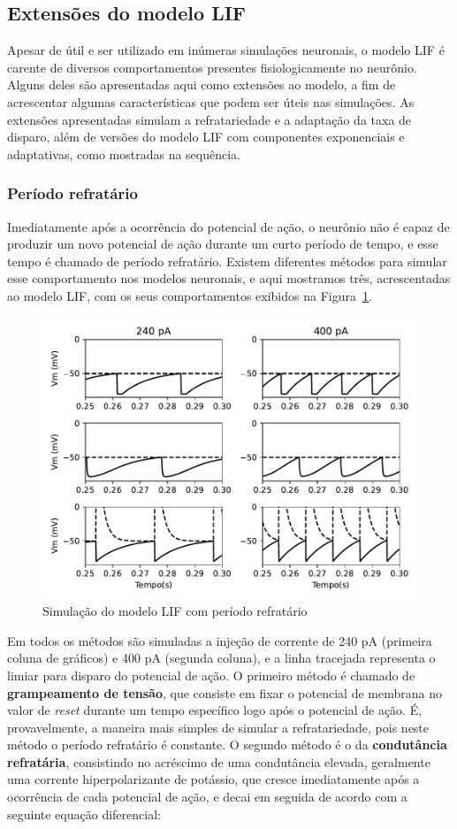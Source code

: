 
\subsection{Extensões do modelo LIF}
Apesar de útil e ser utilizado em inúmeras simulações neuronais, o modelo LIF é carente de diversos comportamentos presentes fisiologicamente no neurônio. Alguns deles são apresentadas aqui como extensões ao modelo, a fim de acrescentar algumas características que podem ser úteis nas simulações. As extensões apresentadas simulam a refratariedade e a adaptação da taxa de disparo, além de versões do modelo LIF com componentes exponenciais e adaptativas, como mostradas na sequência.
\subsubsection{Período refratário}
Imediatamente após a ocorrência do potencial de ação, o neurônio não é capaz de produzir um novo potencial de ação durante um curto período de tempo, e esse tempo é chamado de período refratário. Existem diferentes métodos para simular esse comportamento nos modelos neuronais, e aqui mostramos três, acrescentadas ao modelo LIF, com os seus comportamentos exibidos na Figura~\ref{fig:lifrefratario}.
\begin{figure}[tb]
	\centering
	\caption{Simulação do modelo LIF com período refratário}
	\label{fig:lifrefratario}
	\includegraphics[width=0.7\linewidth]{figs/lif_refratario}
\end{figure}
Em todos os métodos são simuladas a injeção de corrente de 240 pA (primeira coluna de gráficos) e 400 pA (segunda coluna), e a linha tracejada representa o limiar para disparo do potencial de ação. O primeiro método é chamado de \textbf{grampeamento de tensão}, que consiste em fixar o potencial de membrana no valor de \textit{reset} durante um tempo específico logo após o potencial de ação. É, provavelmente, a maneira mais simples de simular a refratariedade, pois neste método o período refratário é constante. O segundo método é o da \textbf{condutância refratária}, consistindo no acréscimo de uma condutância elevada, geralmente uma corrente hiperpolarizante de potássio, que cresce imediatamente após a ocorrência de cada potencial de ação, e decai em seguida de acordo com a seguinte equação diferencial:

